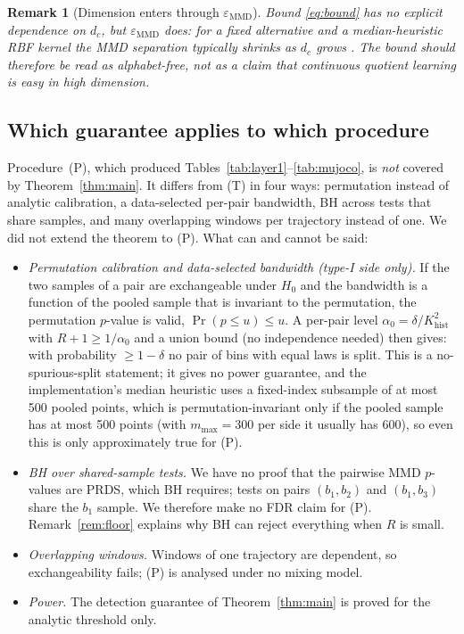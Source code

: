 \documentclass[10pt]{article}
\newtheorem{remark}{Remark}
\newcommand{\epsMMD}{\varepsilon_{\mathrm{MMD}}}
\newcommand{\Khist}{K_{\mathrm{hist}}}
\begin{document}
\begin{remark}[Dimension enters through $\epsMMD$]
\label{rem:dimension}
Bound \eqref{eq:bound} has no explicit dependence on $d_c$, but $\epsMMD$
does: for a fixed alternative and a median-heuristic RBF kernel the MMD
separation typically shrinks as $d_c$ grows \citep{Ramdas2015}.  The bound
should therefore be read as \emph{alphabet-free}, not as a claim that
continuous quotient learning is easy in high dimension.
\end{remark}

\subsection{Which guarantee applies to which procedure}
\label{sec:scope}
Procedure~(P), which produced Tables~\ref{tab:layer1}--\ref{tab:mujoco}, is
\emph{not} covered by Theorem~\ref{thm:main}.  It differs from (T) in four ways:
permutation instead of analytic calibration, a data-selected per-pair
bandwidth, BH across tests that share samples, and many overlapping windows
per trajectory instead of one.  We did not extend the theorem to (P).  What can and cannot be said:
\begin{itemize}
\item \emph{Permutation calibration and data-selected bandwidth (type-I side
  only).}  If the two samples of a pair are exchangeable under $H_0$ and the
  bandwidth is a function of the pooled sample that is invariant to the
  permutation, the permutation $p$-value is valid, $\Pr(p\le u)\le u$.  A
  per-pair level $\alpha_0=\delta/\Khist^2$ with $R+1\ge1/\alpha_0$ and a union
  bound (no independence needed) then gives: with probability $\ge1-\delta$ no
  pair of bins with equal laws is split.  This is a no-spurious-split
  statement; it gives no power guarantee, and the implementation's median
  heuristic uses a fixed-index subsample of at most 500 pooled points, which is
  permutation-invariant only if the pooled sample has at most 500 points
  (with $m_{\max}=300$ per side it usually has 600), so even this is only
  approximately true for (P).
\item \emph{BH over shared-sample tests.}  We have no proof that the pairwise
  MMD $p$-values are PRDS, which BH requires; tests on pairs $(b_1,b_2)$ and
  $(b_1,b_3)$ share the $b_1$ sample.  We therefore make no FDR claim for (P).
  Remark~\ref{rem:floor} explains why BH can reject everything when $R$ is small.
\item \emph{Overlapping windows.}  Windows of one trajectory are dependent, so
  exchangeability fails; (P) is analysed under no mixing model.
\item \emph{Power.}  The detection guarantee of Theorem~\ref{thm:main} is proved
  for the analytic threshold only.
\end{itemize}
\end{document}
